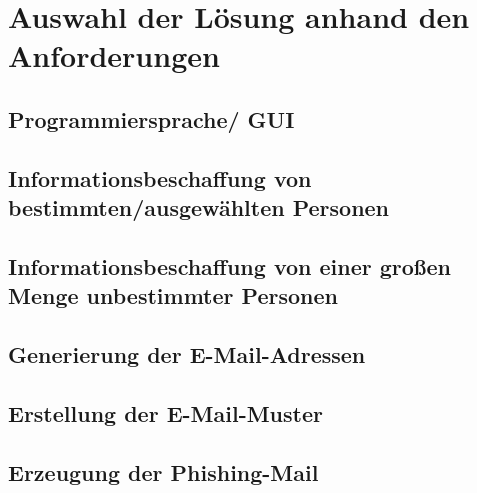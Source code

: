 

\chapter{Auswahl der Lösung anhand den Anforderungen}  %
\label{cha:Auswahl der Lösung anhand Anforderungen} %
\section{Programmiersprache/ GUI}

\section{Informationsbeschaffung von bestimmten/ausgewählten Personen}
	
\section{Informationsbeschaffung von einer großen Menge unbestimmter Personen}

\section{Generierung der E-Mail-Adressen}

\section{Erstellung der E-Mail-Muster}

\section{Erzeugung der Phishing-Mail}